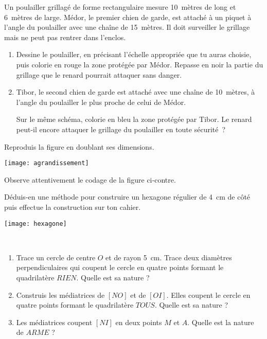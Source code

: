 \begin{exercice}
Un poulailler grillagé de forme rectangulaire mesure 10 mètres de long et 6 mètres de large. Médor, le premier chien de garde, est attaché à un piquet à l'angle du poulailler avec une chaîne de 15 mètres. Il doit surveiller le grillage mais ne peut pas rentrer dans l'enclos. 
\begin{enumerate}
 \item Dessine le poulailler, en précisant l'échelle appropriée que tu auras choisie, puis colorie en rouge la zone protégée par Médor. Repasse en noir la partie du grillage que le renard pourrait attaquer sans danger.
 \item Tibor, le second chien de garde est attaché avec une chaîne de 10 mètres, à l'angle du poulailler le plus proche de celui de Médor.
 
Sur le même schéma, colorie en bleu la zone protégée par Tibor. Le renard peut-il encore attaquer le grillage du poulailler en toute sécurité ?
 \end{enumerate}
\end{exercice}


\begin{exercice}[Agrandissement]
Reproduis la figure en doublant ses dimensions.
\begin{center} \texttt{[image: agrandissement]} \end{center}
\end{exercice}


\begin{exercice}

\begin{minipage}[c]{0.50\linewidth}
Observe attentivement le codage de la figure ci‑contre. 

Déduis-en une méthode pour construire un hexagone régulier de 4 cm de côté puis effectue la construction sur ton cahier.
 \end{minipage} \hfill%
 \begin{minipage}[c]{0.46\linewidth}
  \begin{center} \texttt{[image: hexagone]} \end{center}
  \end{minipage} \\
\end{exercice}


\begin{exercice}
\begin{enumerate}
 \item Trace un cercle de centre $O$ et de rayon 5 cm. Trace deux diamètres perpendiculaires qui coupent le cercle en quatre points formant le quadrilatère $RIEN$. Quelle est sa nature ?
 \item Construis les médiatrices de $[NO]$ et de $[OI]$. Elles coupent le cercle en quatre points formant le quadrilatère $TOUS$. Quelle est sa nature ?
 \item Les médiatrices coupent $[NI]$ en deux points $M$ et $A$. Quelle est la nature de $ARME$ ?
 \end{enumerate}
\end{exercice}


